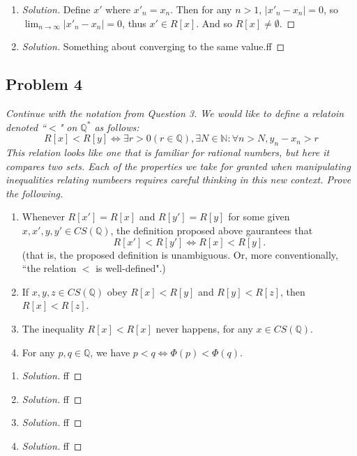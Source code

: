 \documentclass{article}
\newcommand{\N}{{\mathbb N}}
\newcommand{\Q}{{\mathbb Q}}
\begin{document}
\begin{enumerate}
	\item \begin{proof}[Solution]\let\qed\relax
		Define $x'$ where $x'_n = x_n$.
		Then for any $n > 1$, $|x'_n - x_n| = 0$,
		so $\lim_{n\to\infty}|x'_n - x_n| = 0$,
		thus $x' \in R[x]$.
		And so $R[x] \neq \emptyset$.
	\end{proof}
	\item \begin{proof}[Solution]\let\qed\relax
		Something about converging to the same value.ff
	\end{proof}
\end{enumerate}
\clearpage

\subsection*{Problem 4}
{\it Continue with the notation from Question 3.
	We would like to define a relatoin denoted ``$<$" on $\Q^*$ as follows:
	\[
		R[x] < R[y] \iff \exists r > 0 (r \in \Q), \exists N \in \N
		\colon \forall n > N, y_n - x_n > r
	\]
	This relation looks like one that is familiar for rational numbers,
	but here it compares two \emph{sets}.
	Each of the properties we take for granted when manipulating inequalities
	relating numbeers requires careful thinking in this new context.
	Prove the following.
\begin{enumerate}
	\item Whenever $R[x'] = R[x]$ and $R[y'] = R[y]$
		for some given $x,x',y,y' \in CS(\Q)$,
		the definition proposed above gaurantees that
		\[
			R[x'] < R[y'] \iff R[x] < R[y].
		\]
		(that is, the proposed definition is unambiguous.
		Or, more conventionally,
		``the relation $<$ is well-defined".)
	\item If $x,y,z \in CS(\Q)$ obey $R[x] < R[y]$ and $R[y] < R[z]$,
		then $R[x] < R[z]$.
	\item The inequality $R[x] < R[x]$ never happens, for any $x \in CS(\Q)$.
	\item For any $p,q \in \Q$, we have $p<q \iff \Phi(p) < \Phi(q)$.
\end{enumerate}}

\begin{enumerate}
	\item \begin{proof}[Solution]\let\qed\relax
		ff
	\end{proof}
	\item \begin{proof}[Solution]\let\qed\relax
		ff
	\end{proof}
	\item \begin{proof}[Solution]\let\qed\relax
		ff
	\end{proof}
	\item \begin{proof}[Solution]\let\qed\relax
		ff
	\end{proof}
\end{enumerate}
\clearpage
\end{document}
